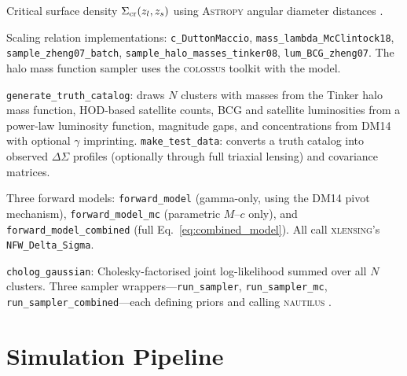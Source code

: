 \documentclass[12pt,a4paper]{article}
\begin{document}
\begin{description}[leftmargin=2em]
  \item[\texttt{destacking/cosmo.py}]
    Critical surface density $\Sigma_{\rm cr}(z_l, z_s)$ using \textsc{Astropy}
    angular diameter distances \citep{astropy2013,astropy2018}.

  \item[\texttt{destacking/relations.py}]
    Scaling relation implementations: \texttt{c\_DuttonMaccio}, \texttt{mass\_lambda\_McClintock18},
    \texttt{sample\_zheng07\_batch}, \texttt{sample\_halo\_masses\_tinker08},
    \texttt{lum\_BCG\_zheng07}.  The halo mass function sampler uses the
    \textsc{colossus} toolkit \citep{Diemer2018} with the \citet{Tinker2008} model.

  \item[\texttt{destacking/simulation.py}]
    \texttt{generate\_truth\_catalog}: draws $N$ clusters with masses from the Tinker
    halo mass function, HOD-based satellite counts, BCG and satellite luminosities from
    a power-law luminosity function, magnitude gaps, and concentrations from DM14 with
    optional $\gamma$ imprinting.  \texttt{make\_test\_data}: converts a truth catalog
    into observed $\Delta\Sigma$ profiles (optionally through full triaxial lensing) and
    covariance matrices.

  \item[\texttt{destacking/model.py}]
    Three forward models: \texttt{forward\_model} (gamma-only, using the DM14 pivot
    mechanism), \texttt{forward\_model\_mc} (parametric $M$--$c$ only), and
    \texttt{forward\_model\_combined} (full Eq.~\ref{eq:combined_model}).  All call
    \textsc{xlensing}'s \texttt{NFW\_Delta\_Sigma}.

  \item[\texttt{destacking/fitting.py}]
    \texttt{cholog\_gaussian}: Cholesky-factorised joint log-likelihood summed over all
    $N$ clusters.  Three sampler wrappers—\texttt{run\_sampler},
    \texttt{run\_sampler\_mc}, \texttt{run\_sampler\_combined}—each defining
    priors and calling \textsc{nautilus} \citep{nautilus2023}.

\end{description}

\section{Simulation Pipeline}
\label{sec:simulation}
\end{document}
